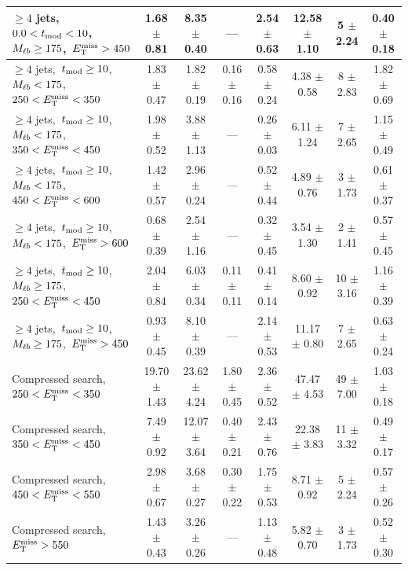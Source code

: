\begin{table}
\begin{tabular}{|l|c c c c c|c|c|}
$\ge4$ jets,~$0.0< t_\text{mod} <10$,~$M_{\ell b}\ge175$,~$E_\text{T}^\text{miss}>450$    & 1.68 $\pm$ 0.81  & 8.35 $\pm$ 0.40   &       ---       & 2.54 $\pm$ 0.63  & 12.58 $\pm$ 1.10  & 5 $\pm$ 2.24    & 0.40 $\pm$ 0.18 \\
\hline
$\ge4$ jets,~$t_\text{mod} \ge10$,~$M_{\ell b}<175$,~$250<E_\text{T}^\text{miss}<350$      & 1.83 $\pm$ 0.47  & 1.82 $\pm$ 0.19   & 0.16 $\pm$ 0.16 & 0.58 $\pm$ 0.24  & 4.38 $\pm$ 0.58   & 8 $\pm$ 2.83    & 1.82 $\pm$ 0.69 \\
$\ge4$ jets,~$t_\text{mod} \ge10$,~$M_{\ell b}<175$,~$350<E_\text{T}^\text{miss}<450$      & 1.98 $\pm$ 0.52  & 3.88 $\pm$ 1.13   &       ---       & 0.26 $\pm$ 0.03  & 6.11 $\pm$ 1.24   & 7 $\pm$ 2.65    & 1.15 $\pm$ 0.49 \\
$\ge4$ jets,~$t_\text{mod} \ge10$,~$M_{\ell b}<175$,~$450<E_\text{T}^\text{miss}<600$      & 1.42 $\pm$ 0.57  & 2.96 $\pm$ 0.24   &       ---       & 0.52 $\pm$ 0.44  & 4.89 $\pm$ 0.76   & 3 $\pm$ 1.73    & 0.61 $\pm$ 0.37 \\
$\ge4$ jets,~$t_\text{mod} \ge10$,~$M_{\ell b}<175$,~$E_\text{T}^\text{miss}>600$          & 0.68 $\pm$ 0.39  & 2.54 $\pm$ 1.16   &       ---       & 0.32 $\pm$ 0.45  & 3.54 $\pm$ 1.30   & 2 $\pm$ 1.41    & 0.57 $\pm$ 0.45 \\
\hline
$\ge4$ jets,~$t_\text{mod} \ge10$,~$M_{\ell b}\ge175$,~$250<E_\text{T}^\text{miss}<450$    & 2.04 $\pm$ 0.84  & 6.03 $\pm$ 0.34   & 0.11 $\pm$ 0.11 & 0.41 $\pm$ 0.14  & 8.60 $\pm$ 0.92   & 10 $\pm$ 3.16   & 1.16 $\pm$ 0.39 \\
$\ge4$ jets,~$t_\text{mod} \ge10$,~$M_{\ell b}\ge175$,~$E_\text{T}^\text{miss}>450$        & 0.93 $\pm$ 0.45  & 8.10 $\pm$ 0.39   &       ---       & 2.14 $\pm$ 0.53  & 11.17 $\pm$ 0.80  & 7 $\pm$ 2.65    & 0.63 $\pm$ 0.24 \\
\hline
Compressed search, $250<E_\text{T}^\text{miss}<350$  & 19.70 $\pm$ 1.43  & 23.62 $\pm$ 4.24  & 1.80 $\pm$ 0.45  & 2.36 $\pm$ 0.52  & 47.47 $\pm$ 4.53  & 49 $\pm$ 7.00  & 1.03 $\pm$ 0.18 \\*
Compressed search, $350<E_\text{T}^\text{miss}<450$  & 7.49 $\pm$ 0.92  & 12.07 $\pm$ 3.64  & 0.40 $\pm$ 0.21  & 2.43 $\pm$ 0.76  & 22.38 $\pm$ 3.83  & 11 $\pm$ 3.32  & 0.49 $\pm$ 0.17 \\*
Compressed search, $450<E_\text{T}^\text{miss}<550$  & 2.98 $\pm$ 0.67  & 3.68 $\pm$ 0.27  & 0.30 $\pm$ 0.22  & 1.75 $\pm$ 0.53  & 8.71 $\pm$ 0.92  & 5 $\pm$ 2.24  & 0.57 $\pm$ 0.26 \\*
Compressed search, $E_\text{T}^\text{miss}>550$      & 1.43 $\pm$ 0.43  & 3.26 $\pm$ 0.26  & ---  & 1.13 $\pm$ 0.48  & 5.82 $\pm$ 0.70  & 3 $\pm$ 1.73  & 0.52 $\pm$ 0.30 \\*
\hline
\end{tabular}
\end{table}


